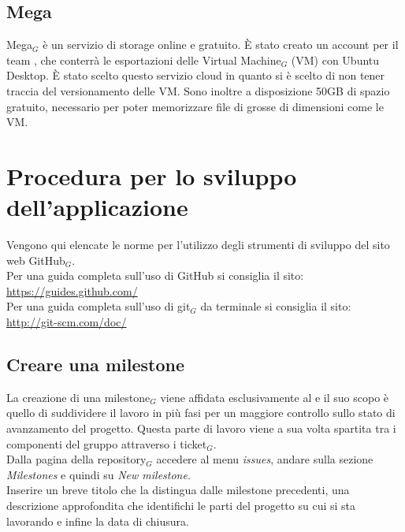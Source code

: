 \subsection{Mega}
Mega$_G$ è un servizio di storage online e gratuito. È stato creato un account per il team \gruppo, che conterrà le esportazioni delle Virtual Machine$_G$ (VM) con Ubuntu Desktop. È stato scelto questo servizio cloud in quanto si è scelto di non tener traccia del versionamento delle VM. Sono inoltre a disposizione 50GB di spazio gratuito, necessario per poter memorizzare file di grosse di dimensioni come le VM.

\newpage
\section{Procedura per lo sviluppo dell'applicazione}
Vengono qui elencate le norme per l'utilizzo degli strumenti di sviluppo del sito web GitHub$_{G}$. \\
Per una guida completa sull'uso di GitHub si consiglia il sito: \\
\url{https://guides.github.com/}\\
Per una guida completa sull'uso di git$_{G}$ da terminale si consiglia il sito: \\
\url{http://git-scm.com/doc/}

\subsection{Creare una milestone}
La creazione di una milestone$_{G}$ viene affidata esclusivamente al \ruoloResponsabile{} e il suo scopo è quello di suddividere il lavoro in più fasi per un maggiore controllo sullo stato di avanzamento del progetto. Questa parte di lavoro viene a sua volta spartita tra i componenti del gruppo attraverso i ticket$_{G}$. \\
    Dalla pagina della repository$_{G}$ accedere al menu \textit{issues}, andare sulla sezione \textit{Milestones} e quindi su \textit{New milestone}.\\
    Inserire un breve titolo che la distingua dalle milestone precedenti, una descrizione approfondita che identifichi le parti del progetto su cui si sta lavorando e infine la data di chiusura.

